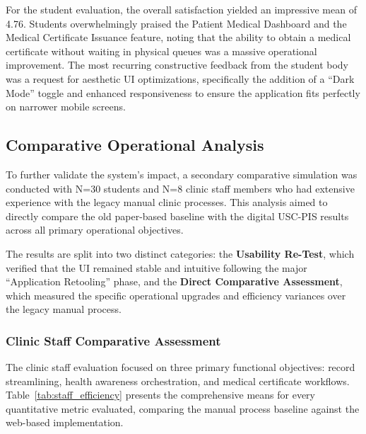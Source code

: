 For the student evaluation, the overall satisfaction yielded an impressive mean of 4.76. Students overwhelmingly praised the Patient Medical Dashboard and the Medical Certificate Issuance feature, noting that the ability to obtain a medical certificate without waiting in physical queues was a massive operational improvement. The most recurring constructive feedback from the student body was a request for aesthetic UI optimizations, specifically the addition of a ``Dark Mode'' toggle and enhanced responsiveness to ensure the application fits perfectly on narrower mobile screens.

\subsection{Comparative Operational Analysis}
To further validate the system's impact, a secondary comparative simulation was conducted with N=30 students and N=8 clinic staff members who had extensive experience with the legacy manual clinic processes. This analysis aimed to directly compare the old paper-based baseline with the digital USC-PIS results across all primary operational objectives.

The results are split into two distinct categories: the \textbf{Usability Re-Test}, which verified that the UI remained stable and intuitive following the major ``Application Retooling'' phase, and the \textbf{Direct Comparative Assessment}, which measured the specific operational upgrades and efficiency variances over the legacy manual process.

\subsubsection{Clinic Staff Comparative Assessment}
The clinic staff evaluation focused on three primary functional objectives: record streamlining, health awareness orchestration, and medical certificate workflows. Table~\ref{tab:staff_efficiency} presents the comprehensive means for every quantitative metric evaluated, comparing the manual process baseline against the web-based implementation.

